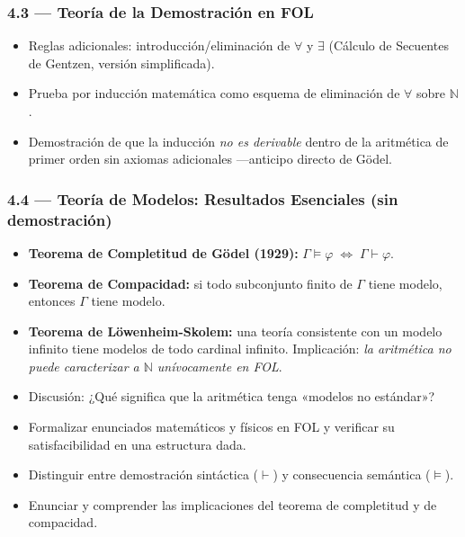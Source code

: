 \documentclass[11pt, letterpaper]{article}
\begin{document}
\subsubsection{4.3 — Teoría de la Demostración en FOL}
\begin{itemize}
  \item Reglas adicionales: introducción/eliminación de $\forall$ y $\exists$ (Cálculo de Secuentes de Gentzen, versión simplificada).
  \item Prueba por inducción matemática como esquema de eliminación de $\forall$ sobre $\mathbb{N}$.
  \item Demostración de que la inducción \emph{no es derivable} dentro de la aritmética de primer orden sin axiomas adicionales —anticipo directo de Gödel.
\end{itemize}

\subsubsection{4.4 — Teoría de Modelos: Resultados Esenciales (sin demostración)}
\begin{itemize}
  \item \textbf{Teorema de Completitud de Gödel (1929):} $\Gamma\models\varphi\;\Leftrightarrow\;\Gamma\vdash\varphi$.
  \item \textbf{Teorema de Compacidad:} si todo subconjunto finito de $\Gamma$ tiene modelo, entonces $\Gamma$ tiene modelo.
  \item \textbf{Teorema de Löwenheim-Skolem:} una teoría consistente con un modelo infinito tiene modelos de todo cardinal infinito. Implicación: \emph{la aritmética no puede caracterizar a $\mathbb{N}$ unívocamente en FOL}.
  \item Discusión: ¿Qué significa que la aritmética tenga «modelos no estándar»?
\end{itemize}

\begin{objetivos}
\begin{itemize}
  \item Formalizar enunciados matemáticos y físicos en FOL y verificar su satisfacibilidad en una estructura dada.
  \item Distinguir entre demostración sintáctica ($\vdash$) y consecuencia semántica ($\models$).
  \item Enunciar y comprender las implicaciones del teorema de completitud y de compacidad.
\end{itemize}
\end{objetivos}
\end{document}

